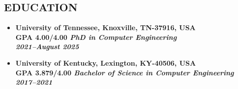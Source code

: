 \documentclass[line,margin,9pt]{res}
\begin{document}
\begin{resume}
\vspace{-10mm}

\section{EDUCATION}
\begin{itemize}
\item \bf{University of Tennessee, Knoxville}, TN-37916, USA\\
\bf GPA 4.00/4.00 \hfill \sl PhD in Computer Engineering\\
\textbf {2021--August 2025}

\item \bf{University of Kentucky}, Lexington, KY-40506, USA\\
\bf GPA 3.879/4.00 \hfill \sl Bachelor of Science in Computer Engineering\\
\textbf {2017--2021}



\end{itemize}




\end{resume}
\end{document}
